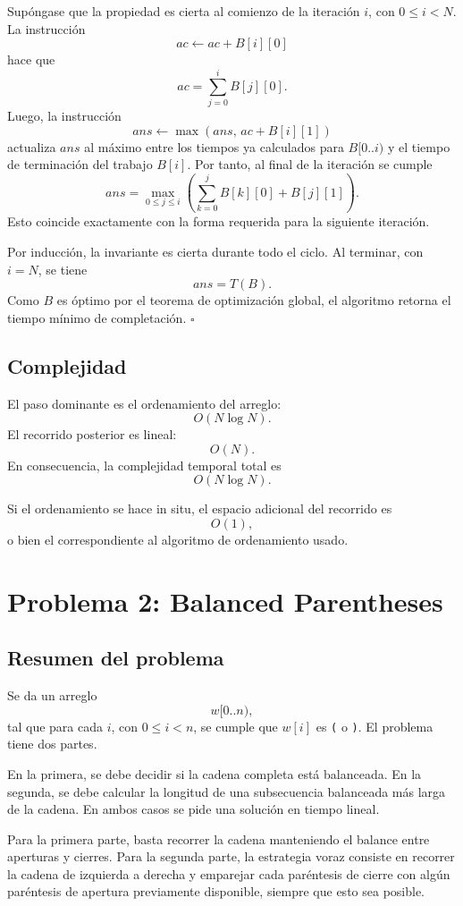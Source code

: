 \documentclass[11pt]{article}
\begin{document}
Supóngase que la propiedad es cierta al comienzo de la iteración \(i\), con \(0\leq i<N\).
La instrucción
\[
ac \gets ac + B[i][0]
\]
hace que
\[
ac=\sum_{j=0}^{i} B[j][0].
\]
Luego, la instrucción
\[
ans \gets \max(ans,\, ac+B[i][1])
\]
actualiza \(ans\) al máximo entre los tiempos ya calculados para \(B[0..i)\) y el tiempo
de terminación del trabajo \(B[i]\). Por tanto, al final de la iteración se cumple
\[
ans=\max_{0\leq j\leq i}\left(\sum_{k=0}^{j} B[k][0]+B[j][1]\right).
\]
Esto coincide exactamente con la forma requerida para la siguiente iteración.

Por inducción, la invariante es cierta durante todo el ciclo. Al terminar, con \(i=N\),
se tiene
\[
ans=T(B).
\]
Como \(B\) es óptimo por el teorema de optimización global, el algoritmo retorna el
tiempo mínimo de completación. \(\square\)

\subsection*{Complejidad}

El paso dominante es el ordenamiento del arreglo:
\[
O(N\log N).
\]
El recorrido posterior es lineal:
\[
O(N).
\]
En consecuencia, la complejidad temporal total es
\[
O(N\log N).
\]

Si el ordenamiento se hace in situ, el espacio adicional del recorrido es
\[
O(1),
\]
o bien el correspondiente al algoritmo de ordenamiento usado.

\newpage

\section{Problema 2: Balanced Parentheses}

\subsection*{Resumen del problema}

Se da un arreglo
\[
w[0..n),
\]
tal que para cada \(i\), con \(0\leq i<n\), se cumple que \(w[i]\) es \texttt{(} o
\texttt{)}. El problema tiene dos partes.

En la primera, se debe decidir si la cadena completa está balanceada. En la segunda,
se debe calcular la longitud de una subsecuencia balanceada más larga de la cadena.
En ambos casos se pide una solución en tiempo lineal.

Para la primera parte, basta recorrer la cadena manteniendo el balance entre aperturas
y cierres. Para la segunda parte, la estrategia voraz consiste en recorrer la cadena de
izquierda a derecha y emparejar cada paréntesis de cierre con algún paréntesis de
apertura previamente disponible, siempre que esto sea posible.
\end{document}
